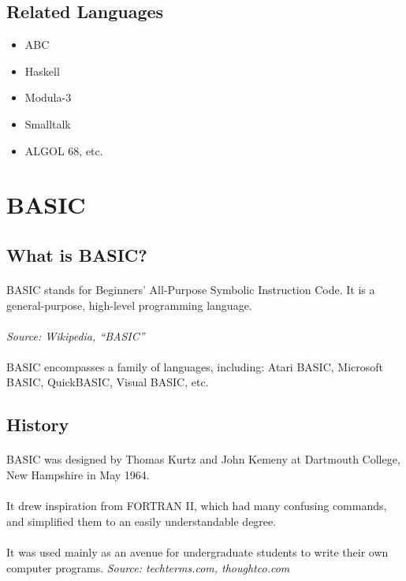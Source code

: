 \documentclass{article}
\begin{document}
	\subsection*{Related Languages}
	\begin{itemize}
		\item ABC
		\item Haskell
		\item Modula-3
		\item Smalltalk
		\item ALGOL 68, etc.
	\end{itemize}


	\section*{BASIC}
	\subsection*{What is BASIC?}
	\paragraph{}BASIC stands for Beginners’ All-Purpose Symbolic Instruction Code.
	It is a general-purpose, high-level programming language.
	\paragraph{}\textit{Source: Wikipedia, “BASIC”}
	\paragraph{}BASIC encompasses a family of languages, including: Atari BASIC, Microsoft BASIC, QuickBASIC, Visual BASIC, etc.
	\subsection*{History}
	\paragraph{}BASIC was designed by Thomas Kurtz and John Kemeny at Dartmouth College, New Hampshire in May 1964.
	\paragraph{}It drew inspiration from FORTRAN II, which had many confusing commands, and simplified them to an easily understandable degree.
	\paragraph{}It was used mainly as an avenue for undergraduate students to write their own computer programs.
	\textit{Source: techterms.com, thoughtco.com}
\end{document}
